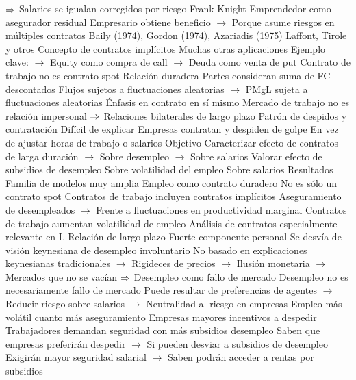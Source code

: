\documentclass{nuevotema}
\begin{document}
\begin{esquemal}
				\4[] $\Rightarrow$ Salarios se igualan corregidos por riesgo
				\4 Frank Knight
				\4[] Emprendedor como asegurador residual
				\4[] Empresario obtiene beneficio
				\4[] $\to$ Porque asume riesgos en múltiples contratos
				\4 Baily (1974), Gordon (1974), Azariadis (1975)
				\4 Laffont, Tirole y otros
				\4 Concepto de contratos implícitos
				\4[] Muchas otras aplicaciones
				\4[] Ejemplo clave:
				\4[] $\to$ Equity como compra de call
				\4[] $\to$ Deuda como venta de put
				\4 Contrato de trabajo no es contrato spot
				\4 Relación duradera
				\4[] Partes consideran suma de FC descontados
				\4 Flujos sujetos a fluctuaciones aleatorias
				\4[] $\to$ PMgL sujeta a fluctuaciones aleatorias
				\4 Énfasis en contrato en sí mismo
				\4[] Mercado de trabajo no es relación impersonal
				\4[] $\Rightarrow$ Relaciones bilaterales de largo plazo
				\4 Patrón de despidos y contratación
				\4[] Difícil de explicar
				\4[] Empresas contratan y despiden de golpe
				\4[] En vez de ajustar horas de trabajo o salarios
			\3 Objetivo
				\4 Caracterizar efecto de contratos de larga duración
				\4[] $\to$ Sobre desempleo
				\4[] $\to$ Sobre salarios
				\4 Valorar efecto de subsidios de desempleo
				\4[] Sobre volatilidad del empleo
				\4[] Sobre salarios
			\3 Resultados
				\4 Familia de modelos muy amplia
				\4 Empleo como contrato duradero
				\4[] No es sólo un contrato spot
				\4 Contratos de trabajo incluyen contratos implícitos
				\4[] Aseguramiento de desempleados
				\4[] $\to$ Frente a fluctuaciones en productividad marginal
				\4 Contratos de trabajo aumentan volatilidad de empleo
				\4 Análisis de contratos especialmente relevante en L
				\4[] Relación de largo plazo
				\4[] Fuerte componente personal
				\4 Se desvía de visión keynesiana de desempleo involuntario
				\4[] No basado en explicaciones keynesianas tradicionales
				\4[] $\to$ Rigideces de precios
				\4[] $\to$ Ilusión monetaria
				\4[] $\to$ Mercados que no se vacían
				\4[] $\Rightarrow$ Desempleo como fallo de mercado
				\4 Desempleo no es necesariamente fallo de mercado
				\4[] Puede resultar de preferencias de agentes
				\4[] $\to$ Reducir riesgo sobre salarios
				\4[] $\to$ Neutralidad al riesgo en empresas
				\4 Empleo más volátil cuanto más aseguramiento
				\4[] Empresas mayores incentivos a despedir
				\4 Trabajadores demandan seguridad con más subsidios desempleo
				\4[] Saben que empresas preferirán despedir
				\4[] $\to$ Si pueden desviar a subsidios de desempleo
				\4[] Exigirán mayor seguridad salarial
				\4[] $\to$ Saben podrán acceder a rentas por subsidios

\end{esquemal}
\end{document}
